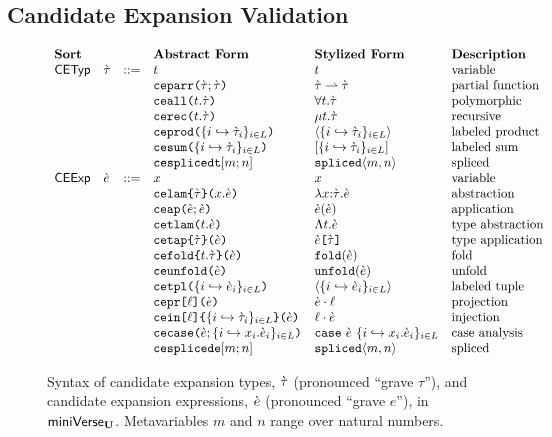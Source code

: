 \subsection{Candidate Expansion Validation}
\begin{figure}
$\begin{array}{lllllll}
\textbf{Sort} & & & \textbf{Abstract Form} & \textbf{Stylized Form} & \textbf{Description}\\
\mathsf{CETyp} & \grave{\tau} & ::= & t & t & \text{variable}\\
&&& \texttt{ceparr}\texttt{(}\grave{\tau}; \grave{\tau}\texttt{)} & \grave{\tau} \rightharpoonup \grave{\tau} & \text{partial function}\\
&&& \texttt{ceall}\texttt{(}t.\grave{\tau}\texttt{)} & \forall t.\grave{\tau} & \text{polymorphic}\\
&&& \texttt{cerec}\texttt{(}t.\grave{\tau}\texttt{)} & \mu t.\grave{\tau} & \text{recursive}\\
&&& \texttt{ceprod}\texttt{(}\{i \hookrightarrow \grave{\tau}_{i}\}_{i \in L}\texttt{)} & \langle \{i \hookrightarrow \grave{\tau}_{i}\}_{i \in L} \rangle & \text{labeled product}\\
&&& \texttt{cesum}\texttt{(}\{i \hookrightarrow \grave{\tau}_{i}\}_{i \in L}\texttt{)} & [\{i \hookrightarrow \grave{\tau}_{i}\}_{i \in L}] & \text{labeled sum}\\
&&& \texttt{cesplicedt}[m; n] & \texttt{spliced}\langle m, n\rangle & \text{spliced}\\
\mathsf{CEExp} & \grave{e} & ::= & x & x & \text{variable}\\
&&& \texttt{celam}\texttt{\{}\grave{\tau}\texttt{\}(}x.\grave{e}\texttt{)} & \lambda x{:}\grave{\tau}.\grave{e} & \text{abstraction}\\
&&& \texttt{ceap}\texttt{(}\grave{e}; \grave{e}\texttt{)} & \grave{e}(\grave{e}) & \text{application}\\
&&& \texttt{cetlam}\texttt{(}t.\grave{e}\texttt{)} & \Lambda t.\grave{e} & \text{type abstraction}\\
&&& \texttt{cetap}\texttt{\{}\grave{\tau}\texttt{\}(}\grave{e}\texttt{)} & \grave{e}\texttt{[}\grave{\tau}\texttt{]} & \text{type application}\\
&&& \texttt{cefold}\texttt{\{}t.\grave{\tau}\texttt{\}(}\grave{e}\texttt{)} & \texttt{fold}(\grave{e}) & \text{fold}\\
&&& \texttt{ceunfold}\texttt{(}\grave{e}\texttt{)} & \texttt{unfold}(\grave{e}) & \text{unfold}\\
&&& \texttt{cetpl}\texttt{(}\{i \hookrightarrow \grave{e}_{i}\}_{i \in L}\texttt{)} & \langle \{i \hookrightarrow \grave{e}_{i}\}_{i \in L}\rangle & \text{labeled tuple}\\
&&& \texttt{cepr}\texttt{[}\ell\texttt{](}\grave{e}\texttt{)} & \grave{e} \cdot \ell & \text{projection}\\
&&& \texttt{cein}\texttt{[}\ell\texttt{]\{}\{i \hookrightarrow \grave{\tau}_{i}\}_{i \in L}\texttt{\}(}\grave{e}\texttt{)} & \ell \cdot \grave{e} & \text{injection}\\
&&& \texttt{cecase}\texttt{(}\grave{e}; \{i \hookrightarrow x_{i}.\grave{e}_{i}\}_{i \in L}\texttt{)} & \texttt{case}~\grave{e}~\{i \hookrightarrow x_{i}.\grave{e}_{i}\}_{i \in L} & \text{case analysis}\\
&&& \texttt{cesplicede}[m; n] & \texttt{spliced}\langle m, n\rangle & \text{spliced}
\end{array}$
\caption[Syntax of candidate expansion types and candidate expansion expressions in $\miniVerseU$.]{Syntax of candidate expansion types, $\grave{\tau}$ (pronounced ``grave $\tau$''), and candidate expansion expressions, $\grave{e}$ (pronounced ``grave $e$''), in $\miniVerseU$. Metavariables $m$ and $n$ range over natural numbers.}
\label{fig:U-candidate-terms}
\end{figure}


